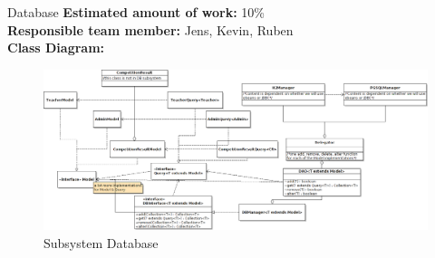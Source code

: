 \begin{subsection}{Database}
	\textbf{Estimated amount of work:} 10\% \\
	\textbf{Responsible team member:} Jens, Kevin, Ruben \\
	\textbf{Class Diagram:} \\
	
	\begin{figure}[!h]
	  \centering
		\includegraphics[width=1\textwidth]{../class_diagrams/database.png}
	  \caption{Subsystem Database}
	  \label{subsystem_database}
	\end{figure}
	
\end{subsection}